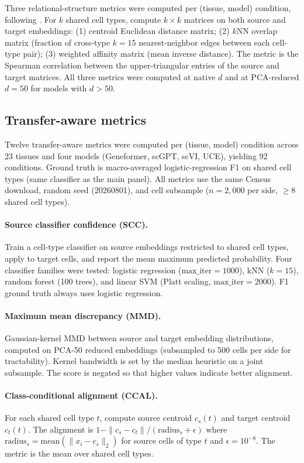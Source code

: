 \documentclass[11pt]{article}
\begin{document}
Three relational-structure metrics were computed per (tissue, model)
condition, following \citet{wang2026scgraph}. For $k$ shared cell types,
compute $k \times k$ matrices on both source and target embeddings: (1)
centroid Euclidean distance matrix; (2) $k$NN overlap matrix (fraction
of cross-type $k = 15$ nearest-neighbor edges between each cell-type
pair); (3) weighted affinity matrix (mean inverse distance). The metric
is the Spearman correlation between the upper-triangular entries of the
source and target matrices. All three metrics were computed at native $d$
and at PCA-reduced $d = 50$ for models with $d > 50$.

\subsection{Transfer-aware metrics}
\label{sec:sccmethod}

Twelve transfer-aware metrics were computed per (tissue, model) condition
across 23 tissues and four models (Geneformer, scGPT, scVI, UCE), yielding
92 conditions. Ground truth is macro-averaged logistic-regression F1 on
shared cell types (same classifier as the main panel). All metrics use
the same Census download, random seed (20260801), and cell subsample
($n = 2{,}000$ per side, $\geq 8$ shared cell types).

\paragraph{Source classifier confidence (SCC).} Train a cell-type
classifier on source embeddings restricted to shared cell types, apply
to target cells, and report the mean maximum predicted probability.
Four classifier families were tested: logistic regression
($\text{max\_iter} = 1000$), kNN ($k = 15$), random forest (100 trees),
and linear SVM (Platt scaling, $\text{max\_iter} = 2000$). F1 ground
truth always uses logistic regression.

\paragraph{Maximum mean discrepancy (MMD).} Gaussian-kernel MMD between
source and target embedding distributions, computed on PCA-50 reduced
embeddings (subsampled to 500 cells per side for tractability). Kernel
bandwidth is set by the median heuristic on a joint subsample. The score
is negated so that higher values indicate better alignment.

\paragraph{Class-conditional alignment (CCAL).} For each shared cell
type $t$, compute source centroid $c_s(t)$ and target centroid $c_t(t)$.
The alignment is $1 - \|c_s - c_t\| / (\text{radius}_s + \epsilon)$
where $\text{radius}_s = \text{mean}(\|x_i - c_s\|_2)$ for source cells
of type $t$ and $\epsilon = 10^{-8}$. The metric is the mean over shared
cell types.
\end{document}
